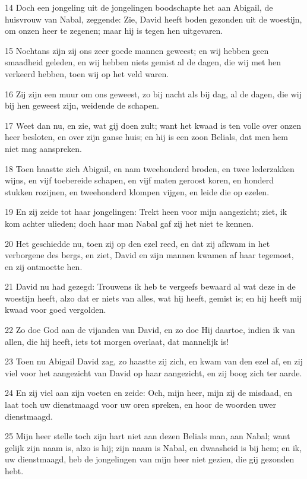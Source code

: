 \par 14 Doch een jongeling uit de jongelingen boodschapte het aan Abigail, de huisvrouw van Nabal, zeggende: Zie, David heeft boden gezonden uit de woestijn, om onzen heer te zegenen; maar hij is tegen hen uitgevaren.
\par 15 Nochtans zijn zij ons zeer goede mannen geweest; en wij hebben geen smaadheid geleden, en wij hebben niets gemist al de dagen, die wij met hen verkeerd hebben, toen wij op het veld waren.
\par 16 Zij zijn een muur om ons geweest, zo bij nacht als bij dag, al de dagen, die wij bij hen geweest zijn, weidende de schapen.
\par 17 Weet dan nu, en zie, wat gij doen zult; want het kwaad is ten volle over onzen heer besloten, en over zijn ganse huis; en hij is een zoon Belials, dat men hem niet mag aanspreken.
\par 18 Toen haastte zich Abigail, en nam tweehonderd broden, en twee lederzakken wijns, en vijf toebereide schapen, en vijf maten geroost koren, en honderd stukken rozijnen, en tweehonderd klompen vijgen, en leide die op ezelen.
\par 19 En zij zeide tot haar jongelingen: Trekt heen voor mijn aangezicht; ziet, ik kom achter ulieden; doch haar man Nabal gaf zij het niet te kennen.
\par 20 Het geschiedde nu, toen zij op den ezel reed, en dat zij afkwam in het verborgene des bergs, en ziet, David en zijn mannen kwamen af haar tegemoet, en zij ontmoette hen.
\par 21 David nu had gezegd: Trouwens ik heb te vergeefs bewaard al wat deze in de woestijn heeft, alzo dat er niets van alles, wat hij heeft, gemist is; en hij heeft mij kwaad voor goed vergolden.
\par 22 Zo doe God aan de vijanden van David, en zo doe Hij daartoe, indien ik van allen, die hij heeft, iets tot morgen overlaat, dat mannelijk is!
\par 23 Toen nu Abigail David zag, zo haastte zij zich, en kwam van den ezel af, en zij viel voor het aangezicht van David op haar aangezicht, en zij boog zich ter aarde.
\par 24 En zij viel aan zijn voeten en zeide: Och, mijn heer, mijn zij de misdaad, en laat toch uw dienstmaagd voor uw oren spreken, en hoor de woorden uwer dienstmaagd.
\par 25 Mijn heer stelle toch zijn hart niet aan dezen Belials man, aan Nabal; want gelijk zijn naam is, alzo is hij; zijn naam is Nabal, en dwaasheid is bij hem; en ik, uw dienstmaagd, heb de jongelingen van mijn heer niet gezien, die gij gezonden hebt.
